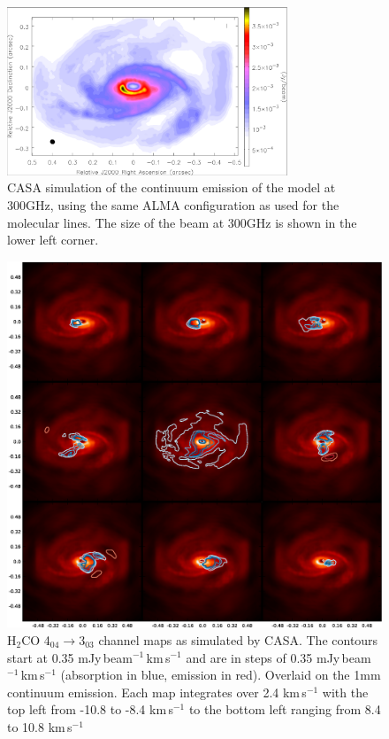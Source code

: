 \documentclass[useAMS,usenatbib]{mn2e}
\begin{document}
\begin{figure}
 \includegraphics[width=84mm]{Figures/sim/casa_cont_300GHz_invert.eps}

 \caption{CASA simulation of the continuum emission of the model at 300GHz, using the same ALMA configuration as used for the molecular lines. The size of the beam at 300GHz is shown in the lower left corner.}
 \label{continuum}
\end{figure}


\begin{figure}
 \includegraphics[width=168mm]{Figures/sim/channel_map-1.eps} 
 \caption{H$_2$CO 4$_{04}\rightarrow$3$_{03}$ channel maps as simulated by CASA. The contours start at 0.35 mJy$\,$beam$^{-1}\,$km$\,$s$^{-1}$  and are in steps of 0.35 mJy$\,$beam$^{-1}\,$km$\,$s$^{-1}$ (absorption in blue, emission in red). Overlaid on the 1mm continuum emission. Each map integrates over 2.4 km$\,$s$^{-1}$ with the top left from -10.8 to -8.4 km$\,$s$^{-1}$ to the bottom left ranging from 8.4 to 10.8 km$\,$s$^{-1}$}
 \label{h2co_chanmap}
\end{figure}
\end{document}
